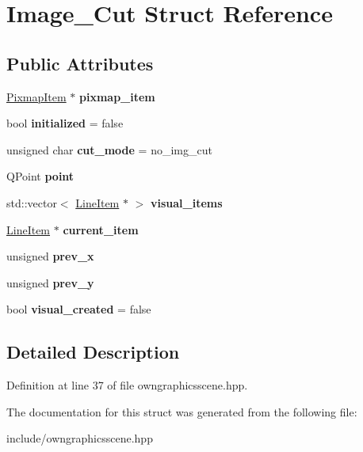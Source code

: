 \hypertarget{structImage__Cut}{}\section{Image\+\_\+\+Cut Struct Reference}
\label{structImage__Cut}
\subsection*{Public Attributes}
\begin{DoxyCompactItemize}
\item 
\mbox{\label{structImage__Cut_afdafc46c968b35b63758d409ef863a8f}} 
\mbox{\hyperlink{classPixmapItem}{Pixmap\+Item}} $\ast$ {\bfseries pixmap\+\_\+item}
\item 
\mbox{\label{structImage__Cut_a7259136300a6eade3ee84743f3e47c1f}} 
bool {\bfseries initialized} = false
\item 
\mbox{\label{structImage__Cut_ad4904a8753086961301a91050f6b2794}} 
unsigned char {\bfseries cut\+\_\+mode} = no\+\_\+img\+\_\+cut
\item 
\mbox{\label{structImage__Cut_a45fc996285a5ae8ef255d66655d63df2}} 
Q\+Point {\bfseries point}
\item 
\mbox{\label{structImage__Cut_ad56f1d72a3d7c5488fec27eaf5c6fbd9}} 
std\+::vector$<$ \mbox{\hyperlink{classLineItem}{Line\+Item}} $\ast$ $>$ {\bfseries visual\+\_\+items}
\item 
\mbox{\label{structImage__Cut_aa3fcac1ab311c38947b343d8913fb2e8}} 
\mbox{\hyperlink{classLineItem}{Line\+Item}} $\ast$ {\bfseries current\+\_\+item}
\item 
\mbox{\label{structImage__Cut_a9e6768e7bea9a60876d086d78da3c4df}} 
unsigned {\bfseries prev\+\_\+x}
\item 
\mbox{\label{structImage__Cut_ad86dabb21b97270448d8db5aa7a5676f}} 
unsigned {\bfseries prev\+\_\+y}
\item 
\mbox{\label{structImage__Cut_acbae7507f135d85e9f2f9724fbc2a643}} 
bool {\bfseries visual\+\_\+created} = false
\end{DoxyCompactItemize}


\subsection{Detailed Description}


Definition at line 37 of file owngraphicsscene.\+hpp.



The documentation for this struct was generated from the following file\+:\begin{DoxyCompactItemize}
\item 
include/owngraphicsscene.\+hpp\end{DoxyCompactItemize}

